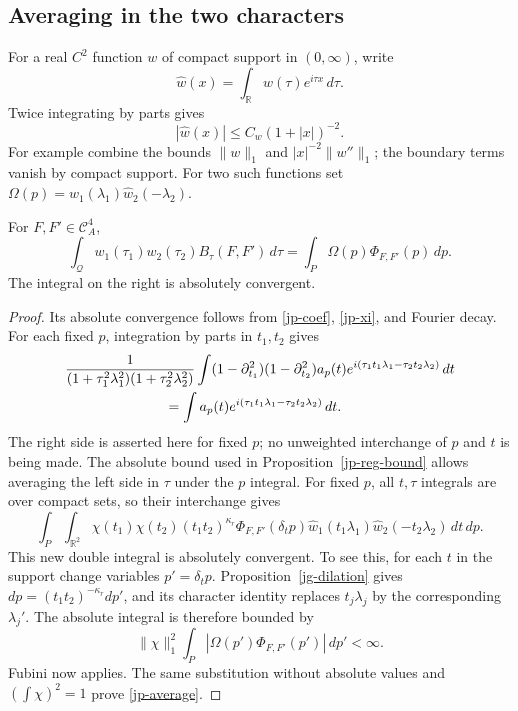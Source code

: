 \subsection{Averaging in the two characters}

For a real \(C^2\) function \(w\) of compact support in
\((0,\infty)\), write
\[
                \widehat w(x)=\int_{\mathbb R}w(\tau)e^{i\tau x}\,d\tau.
\]
Twice integrating by parts gives
\[
          |\widehat w(x)|\leq C_w(1+|x|)^{-2}.
\]
For example combine the bounds \(\|w\|_1\) and
\(|x|^{-2}\|w''\|_1\); the boundary terms vanish by compact
support.
For two such functions set
\(\Omega(p)=\widehat w_1(\lambda_1)\widehat w_2(-\lambda_2)\).

\begin{proposition}\label{jp-reg-average}
For \(F,F'\in\mathcal C_A^4\),
\begin{equation}\label{jp-average}
 \int_{\mathcal Q}w_1(\tau_1)w_2(\tau_2)B_\tau(F,F')\,d\tau
                           =\int_P\Omega(p)\Phi_{F,F'}(p)\,dp .
\end{equation}
The integral on the right is absolutely convergent.
\end{proposition}

\begin{proof}
Its absolute convergence follows from
\eqref{jp-coef}, \eqref{jp-xi}, and Fourier decay.
For each fixed \(p\), integration by parts in \(t_1,t_2\)
gives
\[
 \begin{split}
 &\frac{1}{(1+\tau_1^2\lambda_1^2)(1+\tau_2^2\lambda_2^2)}
    \int (1-\partial_{t_1}^2)(1-\partial_{t_2}^2)a_p(t)
                         e^{i(\tau_1t_1\lambda_1-\tau_2t_2\lambda_2)}\,dt\\
 &\hspace{25mm}
       =\int a_p(t)e^{i(\tau_1t_1\lambda_1-\tau_2t_2\lambda_2)}\,dt .
 \end{split}
\]
The right side is asserted here for fixed \(p\); no unweighted
interchange of \(p\) and \(t\) is being made.
The absolute bound used in Proposition~\ref{jp-reg-bound}
allows averaging the left side in \(\tau\) under the \(p\)
integral.  For fixed \(p\), all \(t,\tau\) integrals are
over compact sets, so their interchange gives
\[
 \int_P\int_{\mathbb R^2}
       \chi(t_1)\chi(t_2)(t_1t_2)^{\kappa_r}
       \Phi_{F,F'}(\delta_t p)
       \widehat w_1(t_1\lambda_1)
       \widehat w_2(-t_2\lambda_2)\,dt\,dp .
\]
This new double integral is absolutely convergent.
To see this, for each \(t\) in the support change variables
\(p'=\delta_t p\).
Proposition~\ref{jg-dilation} gives
\(dp=(t_1t_2)^{-\kappa_r}dp'\), and its character identity
replaces \(t_j\lambda_j\) by the corresponding \(\lambda_j'\).
The absolute integral is therefore bounded by
\[
 \|\chi\|_1^2\int_P|\Omega(p')\Phi_{F,F'}(p')|\,dp'<\infty .
\]
Fubini now applies.  The same substitution without absolute
values and \((\int\chi)^2=1\) prove \eqref{jp-average}.
\end{proof}

